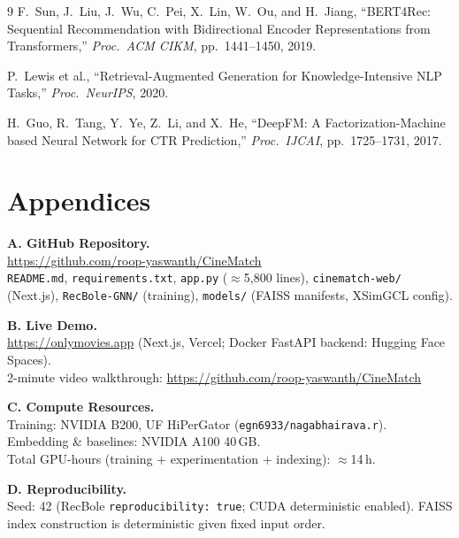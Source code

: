 \documentclass[conference]{IEEEtran}
\begin{document}
\begin{thebibliography}{9}
F.~Sun, J.~Liu, J.~Wu, C.~Pei, X.~Lin, W.~Ou, and H.~Jiang,
``BERT4Rec: Sequential Recommendation with
Bidirectional Encoder Representations from Transformers,''
\textit{Proc.\ ACM CIKM}, pp.\ 1441--1450, 2019.

P.~Lewis et al.,
``Retrieval-Augmented Generation for
Knowledge-Intensive NLP Tasks,''
\textit{Proc.\ NeurIPS}, 2020.

H.~Guo, R.~Tang, Y.~Ye, Z.~Li, and X.~He,
``DeepFM: A Factorization-Machine based Neural Network
for CTR Prediction,''
\textit{Proc.\ IJCAI}, pp.\ 1725--1731, 2017.

\end{thebibliography}

\appendix
\section*{Appendices}

\textbf{A. GitHub Repository.}\\
\url{https://github.com/roop-yaswanth/CineMatch}\\
\texttt{README.md}, \texttt{requirements.txt}, \texttt{app.py}
($\approx$5,800 lines), \texttt{cinematch-web/} (Next.js),
\texttt{RecBole-GNN/} (training), \texttt{models/} (FAISS manifests,
XSimGCL config).

\vspace{1mm}
\textbf{B. Live Demo.}\\
\url{https://onlymovies.app}
(Next.js, Vercel; Docker FastAPI backend: Hugging Face Spaces).\\
2-minute video walkthrough:
\url{https://github.com/roop-yaswanth/CineMatch}

\vspace{1mm}
\textbf{C. Compute Resources.}\\
Training: NVIDIA B200, UF HiPerGator (\texttt{egn6933/nagabhairava.r}).\\
Embedding \& baselines: NVIDIA A100 40\,GB.\\
Total GPU-hours (training + experimentation + indexing):
$\approx$14\,h.

\vspace{1mm}
\textbf{D. Reproducibility.}\\
Seed: 42 (RecBole \texttt{reproducibility: true};
CUDA deterministic enabled).
FAISS index construction is deterministic given fixed input order.
\end{document}
